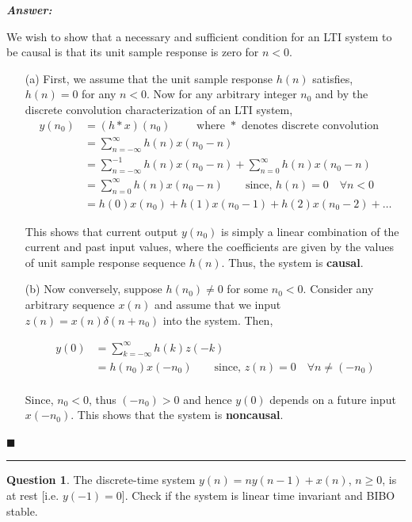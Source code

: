 \documentclass[12pt]{article}
\theoremstyle{definition}
\newtheorem{question}{Question}
\newenvironment{answer}{
    \textbf{\textit{Answer:}} \qquad
}{\hfill $\blacksquare$ \\ \begin{center}
    \rule{0.6\linewidth}{0.5px}    
\end{center}
}
\begin{document}
\begin{answer}
    We wish to show that a necessary and sufficient condition for an LTI system to be causal is that its unit sample response is zero for $n < 0$.
    \begin{enumerate}
        \item[(a)] First, we assume that the unit sample response $h(n)$ satisfies, $h(n) = 0$ for any $n < 0$. Now for any arbitrary integer $n_0$ and by the discrete convolution characterization of an LTI system,
        \begin{align*}
            y(n_0) 
            & = (h \ast x)(n_0) \qquad \text{ where } \ast \text{ denotes discrete convolution}\\
            & = \sum_{n = -\infty}^{\infty} h(n)x(n_0 - n)\\
            & = \sum_{n = -\infty}^{-1} h(n)x(n_0 - n) + \sum_{n = 0}^{\infty} h(n)x(n_0 - n)\\
            & = \sum_{n = 0}^{\infty} h(n)x(n_0 - n) \qquad \text{since, } h(n) = 0 \quad \forall n < 0\\
            & = h(0)x(n_0) + h(1)x(n_0 - 1) + h(2)x(n_0 - 2) + \dots
        \end{align*}

        This shows that current output $y(n_0)$ is simply a linear combination of the current and past input values, where the coefficients are given by the values of unit sample response sequence $h(n)$. Thus, the system is \textbf{causal}.

        \item[(b)] Now conversely, suppose $h(n_0) \neq 0$ for some $n_0 < 0$. Consider any arbitrary sequence $x(n)$ and assume that we input $z(n) = x(n)\delta(n + n_0)$ into the system. Then,
        
        \begin{align*}
            y(0) 
            & = \sum_{k = -\infty}^{\infty} h(k)z(-k)\\
            & = h(n_0) x(-n_0)  \qquad \text{since, } z(n) = 0 \quad \forall n \neq (-n_0)\\
        \end{align*}

        Since, $n_0 < 0$, thus $(-n_0) > 0$ and hence $y(0)$ depends on a future input $x(-n_0)$. This shows that the system is \textbf{noncausal}.
    \end{enumerate}
\end{answer}


\begin{question}
    The discrete-time system $y(n) = ny(n - 1) + x(n)$, $n \geq 0$, is at rest [i.e. $y(-1) = 0$]. Check if the system is linear time invariant and BIBO stable.     
\end{question}
\end{document}

